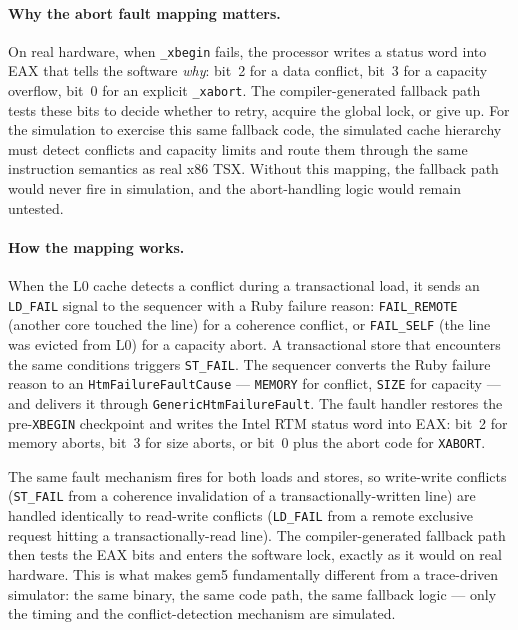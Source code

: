 \paragraph{Why the abort fault mapping matters.} On real hardware, when \texttt{\_xbegin} fails, the processor writes a status word into EAX that tells the software \emph{why}: bit~2 for a data conflict, bit~3 for a capacity overflow, bit~0 for an explicit \texttt{\_xabort}. The compiler-generated fallback path tests these bits to decide whether to retry, acquire the global lock, or give up. For the simulation to exercise this same fallback code, the simulated cache hierarchy must detect conflicts and capacity limits and route them through the same instruction semantics as real x86 TSX. Without this mapping, the fallback path would never fire in simulation, and the abort-handling logic would remain untested.

\paragraph{How the mapping works.} When the L0 cache detects a conflict during a transactional load, it sends an \texttt{LD\_FAIL} signal to the sequencer with a Ruby failure reason: \texttt{FAIL\_REMOTE} (another core touched the line) for a coherence conflict, or \texttt{FAIL\_SELF} (the line was evicted from L0) for a capacity abort. A transactional store that encounters the same conditions triggers \texttt{ST\_FAIL}. The sequencer converts the Ruby failure reason to an \texttt{HtmFailureFaultCause} --- \texttt{MEMORY} for conflict, \texttt{SIZE} for capacity --- and delivers it through \texttt{GenericHtmFailureFault}. The fault handler restores the pre-\texttt{XBEGIN} checkpoint and writes the Intel RTM status word into EAX: bit~2 for memory aborts, bit~3 for size aborts, or bit~0 plus the abort code for \texttt{XABORT}.

The same fault mechanism fires for both loads and stores, so write-write conflicts (\texttt{ST\_FAIL} from a coherence invalidation of a transactionally-written line) are handled identically to read-write conflicts (\texttt{LD\_FAIL} from a remote exclusive request hitting a transactionally-read line). The compiler-generated fallback path then tests the EAX bits and enters the software lock, exactly as it would on real hardware. This is what makes gem5 fundamentally different from a trace-driven simulator: the same binary, the same code path, the same fallback logic --- only the timing and the conflict-detection mechanism are simulated.

